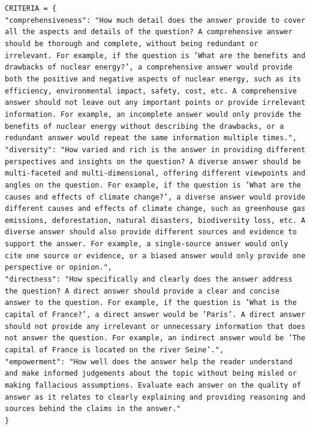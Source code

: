 \documentclass{article}
\begin{document}
\texttt{CRITERIA = \{\\
    "comprehensiveness": "How much detail does the answer provide to cover all the aspects and details of the question? A comprehensive answer should be thorough and complete, without being redundant or irrelevant. For example, if the question is 'What are the benefits and drawbacks of nuclear energy?', a comprehensive answer would provide both the positive and negative aspects of nuclear energy, such as its efficiency, environmental impact, safety, cost, etc. A comprehensive answer should not leave out any important points or provide irrelevant information. For example, an incomplete answer would only provide the benefits of nuclear energy without describing the drawbacks, or a redundant answer would repeat the same information multiple times.",\\
    "diversity": "How varied and rich is the answer in providing different perspectives and insights on the question? A diverse answer should be multi-faceted and multi-dimensional, offering different viewpoints and angles on the question. For example, if the question is 'What are the causes and effects of climate change?', a diverse answer would provide different causes and effects of climate change, such as greenhouse gas emissions, deforestation, natural disasters, biodiversity loss, etc. A diverse answer should also provide different sources and evidence to support the answer. For example, a single-source answer would only cite one source or evidence, or a biased answer would only provide one perspective or opinion.",\\
    "directness": "How specifically and clearly does the answer address the question? A direct answer should provide a clear and concise answer to the question. For example, if the question is 'What is the capital of France?', a direct answer would be 'Paris'. A direct answer should not provide any irrelevant or unnecessary information that does not answer the question. For example, an indirect answer would be 'The capital of France is located on the river Seine'.",\\
    "empowerment": "How well does the answer help the reader understand and make informed judgements about the topic without being misled or making fallacious assumptions. Evaluate each answer on the quality of answer as it relates to clearly explaining and providing reasoning and sources behind the claims in the answer."\\
\}}
\end{document}
